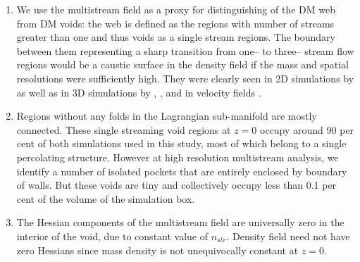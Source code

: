 \begin{enumerate}

\item We use the multistream field as a proxy for distinguishing of the DM web from DM voids: the web is defined as the regions
with number of streams greater than one and thus voids  as  a single stream regions. The boundary between them  
representing a sharp transition from one-- to three-- stream flow regions
would be a caustic surface in the density field if the mass and spatial resolutions were sufficiently high. They were clearly seen in 
2D simulations by \cite{Melott1989} as well as in 3D simulations by \cite{Angulo2016}, \cite{Hahn2016a}, \cite{Hahn2013} and in velocity fields \cite{Hahn2015a}.

\item Regions without any folds in the Lagrangian sub-manifold are mostly connected. These single streaming void regions at $z=0$ occupy around 90 per cent of both simulations used in this study, most of which belong to a single percolating structure. However at high resolution multistream analysis, we identify a number of isolated pockets that are entirely enclosed by boundary of walls. But these voids are tiny and collectively occupy less than 0.1 per cent of the volume of the simulation box.

\item The Hessian components of the multistream field are universally zero in the interior of the void, due to constant value of $n_{str}$. Density field need not have zero Hessians since mass density is not unequivocally constant at $z=0$. 

\end{enumerate}
